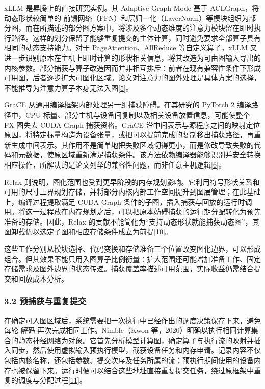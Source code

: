 \documentclass[UTF8,11pt,fontset=windows]{ctexart}
\begin{document}
xLLM 是昇腾上的直接研究实例。其 Adaptive Graph Mode 基于 ACLGraph，将动态形状较简单的 前馈网络（FFN）和层归一化（LayerNorm）等模块组织为部分图，而在所描述的部分图方案中，将涉及多个动态维度的注意力模块留在即时执行路径。这样的划分保留了能够重复提交的主体计算，同时避免要求全部算子具有相同的动态支持能力。对于 PageAttention、AllReduce 等自定义算子，xLLM 又进一步识别原本在主机上即时计算的形状相关信息，将其改造为可由图输入导出的内核参数。部分捕获与算子改造因而并非相互排斥：前者在现有兼容性条件下形成可用图，后者逐步扩大可图化区域。论文对注意力的图外处理是具体方案的选择，不能推导为注意力算子本身无法入图\protect\hyperlink{ref-5}{{[}5{]}}。

GraCE 从通用编译框架内部处理另一组捕获障碍。在其研究的 PyTorch 2 编译路径中，CPU 标量、部分主机与设备间复制以及相关设备放置信息，可能使整个 FX 图失去 CUDA Graph 捕获资格。GraCE 沿中间表示与源程序之间的映射定位原因，将特定标量构造为设备张量，或把可以提前完成的复制移出捕获路径，再重新生成中间表示。其作用不是简单地把失败区域切得更小，而是修改导致失败的代码和元数据，使原区域重新满足捕获条件。该方法依赖编译器能够识别并安全转换相应操作，所解决的是论文列举的兼容性问题，而非任意主机逻辑\protect\hyperlink{ref-6}{{[}6{]}}。

Relax 则说明，图化范围也受到更早阶段的内存规划影响。它利用符号形状关系和可用的尺寸上界规划存储，并将部分内核内部工作空间提升到图层管理；在此基础上，编译过程提取满足 CUDA Graph 条件的子图，插入捕获与回放的运行时调用。将这一过程放在内存规划之后，可以把原本妨碍捕获的运行期分配转化为预先准备的存储。因此，Relax 的贡献不能简化为``支持动态形状就能捕获动态图''，其图卸载仍以选定子图和相应存储条件成立为前提\protect\hyperlink{ref-10}{{[}10{]}}。

这些工作分别从模块选择、代码变换和存储准备三个位置改变图化边界，可以形成组合。但其效果不能只用入图算子比例衡量：扩大范围还可能增加准备工作、固定存储需求及图外边界的状态传递。捕获覆盖率描述可用范围，实际收益仍需结合提交和回放成本分析。

\hypertarget{section-3-2}{%
\subsubsection{\texorpdfstring{\textbf{3.2 预捕获与重复提交}}{3.2 预捕获与重复提交}}\label{section-3-2}}

在确定可入图区域后，系统需要把一次执行中已经作出的调度决策保存下来，避免每轮 解码 再次完成相同工作。Nimble（Kwon 等，2020）明确以执行相同计算集合的静态神经网络为对象。它首先分析模型计算图，确定算子与执行流的映射并插入同步，然后使用虚拟输入预执行模型，截获设备任务和内存申请。记录内容不仅包括内核名称，还包括参数、提交次序及任务所属的流；预执行期间使用的设备内存也被保留下来。运行时便可以结合这些地址直接重复提交任务，绕过原框架中重复的调度与分配过程\protect\hyperlink{ref-11}{{[}11{]}}。
\end{document}

